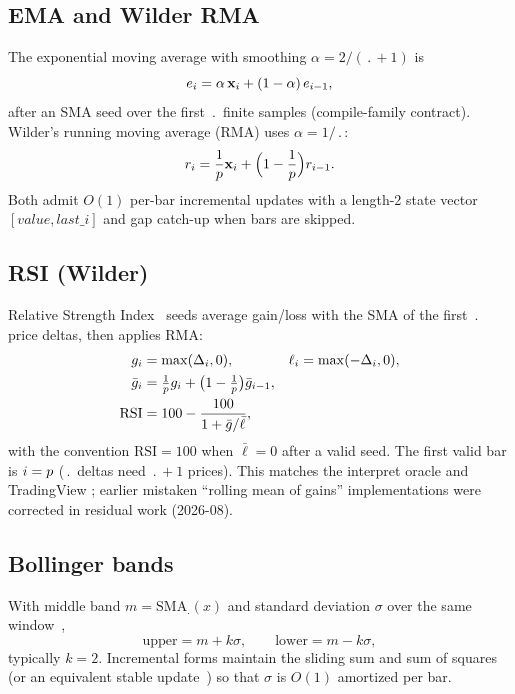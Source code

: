 \documentclass[11pt,a4paper]{article}
\begin{document}
\subsection{EMA and Wilder RMA}

The exponential moving average with smoothing $\alpha = 2/(\period+1)$ is
\begin{equation}
  \label{eq:ema}
  e_{i}
  =
  \alpha\,\mathbf{x}_{i}
  + (1-\alpha)\,e_{i-1},
\end{equation}
after an SMA seed over the first $\period$ finite samples (compile-family
contract). Wilder's running moving average (RMA) uses
$\alpha = 1/\period$:
\begin{equation}
  \label{eq:rma}
  r_{i}
  =
  \frac{1}{p}\mathbf{x}_{i}
  + \Bigl(1-\frac{1}{p}\Bigr) r_{i-1}.
\end{equation}
Both admit $O(1)$ per-bar incremental updates with a length-2 state vector
$[\mathit{value}, \mathit{last\_i}]$ and gap catch-up when bars are skipped.

\subsection{RSI (Wilder)}

Relative Strength Index~\citep{wilder1978new} seeds average gain/loss with
the SMA of the first $\period$ price deltas, then applies RMA:
\begin{align}
  \label{eq:rsi}
  g_{i} &= \max(\Delta_{i}, 0),
  &
  \ell_{i} &= \max(-\Delta_{i}, 0),
  \\
  \bar{g}_{i}
    &= \tfrac{1}{p} g_{i}
      + \bigl(1-\tfrac{1}{p}\bigr)\bar{g}_{i-1},
  \\
  \mathrm{RSI}
    &= 100 - \frac{100}{1 + \bar{g}/\bar{\ell}},
\end{align}
with the convention $\mathrm{RSI}=100$ when $\bar{\ell}=0$ after a valid
seed. The first valid bar is $i=p$ ($\period$ deltas need
$\period+1$ prices). This matches the interpret oracle and TradingView
; earlier mistaken ``rolling mean of gains'' implementations
were corrected in residual work (2026-08).

\subsection{Bollinger bands}

With middle band $m=\mathrm{SMA}_{\period}(x)$ and standard deviation
$\sigma$ over the same window~\citep{bollinger2001},
\begin{equation}
  \label{eq:bb}
  \mathrm{upper} = m + k\sigma,
  \qquad
  \mathrm{lower} = m - k\sigma,
\end{equation}
typically $k=2$. Incremental forms maintain the sliding sum and sum of
squares (or an equivalent stable update~\citep{higham2002accuracy}) so that
$\sigma$ is $O(1)$ amortized per bar.
\end{document}
